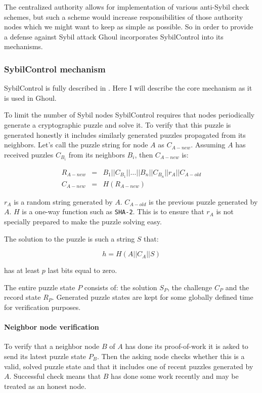  The centralized authority allows for implementation of various anti-Sybil
  check schemes, but such a scheme would increase responsibilities of those
  authority nodes which we might want to keep as simple as possible.
  So in order to provide a defense against Sybil attack Ghoul incorporates
  SybilControl into its mechanisms.

\subsubsection{SybilControl mechanism}
  SybilControl is fully described in \cite{li12}. Here I will describe the core
  mechanism as it is used in Ghoul. 

  To limit the number of Sybil nodes SybilControl requires that nodes
  periodically generate a cryptographic puzzle and solve it. To verify that
  this puzzle is generated honestly it includes similarly generated puzzles
  propagated from its neighbors. Let's call the puzzle string for node $A$ as
  $C_{A-new}$. Assuming $A$ has received puzzles $C_{B_i}$ from its neighbors
  $B_{i}$, then $C_{A-new}$ is:

  \begin{eqnarray*}
      R_{A-new} &=& B_1||C_{B_1}||\ldots||B_n||C_{B_n}||r_A||C_{A-old}\\
    C_{A-new} &=& H\left(R_{A-new}\right)
  \end{eqnarray*}

  $r_A$ is a random string generated by $A$. $C_{A-old}$ is the previous puzzle
  generated by $A$. $H$ is a one-way function such as \texttt{SHA-2}. This is to
  ensure that $r_A$ is not specially prepared to make the puzzle solving easy.

  The solution to the puzzle is such a string $S$ that:

  \[ h = H\left(A||C_A||S\right)\]

  has at least $p$ last bits equal to zero.

  The entire puzzle state $P$ consists of: the solution $S_P$, the challenge
  $C_P$ and the record state $R_P$. Generated puzzle states are kept for some
  globally defined time for verification purposes.

  \paragraph{Neighbor node verification}
  To verify that a neighbor node $B$ of $A$ has done its proof-of-work it is
  asked to send its latest puzzle state $P_B$. Then the asking node checks
  whether this is a valid, solved puzzle state and that it includes one of
  recent puzzles generated by $A$. Successful check means that $B$ has done some
  work recently and may be treated as an honest node.

